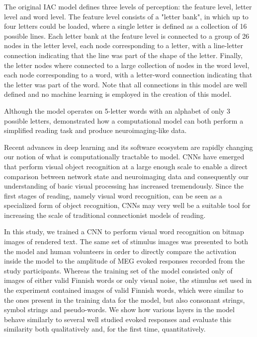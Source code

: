 \documentclass[a4paper, 10pt]{vanvliet_paper}
\begin{document}
The original \gls{IAC} model\cite{McClelland1981} defines three levels of perception: the feature level, letter level and word level.
The feature level consists of a "letter bank", in which up to four letters could be loaded, where a single letter is defined as a collection of 16 possible lines.
Each letter bank at the feature level is connected to a group of 26 nodes in the letter level, each node corresponding to a letter, with a line-letter connection indicating that the line was part of the shape of the letter.
Finally, the letter nodes where connected to a large collection of nodes in the word level, each node corresponding to a word, with a letter-word connection indicating that the letter was part of the word.
Note that all connections in this model are well defined and no machine learning is employed in the creation of this model.

Although the model operates on 5-letter words with an alphabet of only 3 possible letters, \textcite{Laszlo2012} demonstrated how a computational model can both perform a simplified reading task and produce neuroimaging-like data.

Recent advances in deep learning and its software ecosystem are rapidly changing our notion of what is computationally tractable to model\cite{Richards2019}.
\Glspl{CNN} have emerged that perform visual object recognition at a large enough scale to enable a direct comparison between network state and neuroimaging data\cite{Schrimpf2018, Devereux2018, Yamins2016} and consequently our understanding of basic visual processing has increased tremendously\cite{Lindsay2020}.
Since the first stages of reading, namely visual word recognition, can be seen as a specialized form of object recognition, \glspl{CNN} may very well be a suitable tool for increasing the scale of traditional connectionist models of reading.

In this study, we trained a \gls{CNN} to perform visual word recognition on bitmap images of rendered text.
The same set of stimulus images was presented to both the model and human volunteers in order to directly compare the activation inside the model to the amplitude of \gls{MEG} evoked responses recorded from the study participants.
Whereas the training set of the model consisted only of images of either valid Finnish words or only visual noise, the stimulus set used in the experiment contained images of valid Finnish words, which were similar to the ones present in the training data for the model, but also consonant strings, symbol strings and pseudo-words.
We show how various layers in the model behave similarly to several well studied evoked responses and evaluate this similarity both qualitatively and, for the first time, quantitatively.
\end{document}
